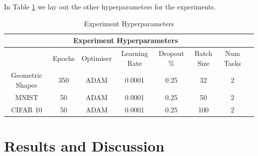 In Table \ref{tab:HyperParams2} we lay out the other hyperparameters for the experiments.

\begin{table}[h!]
\caption{Experiment Hyperparameters} \label{tab:HyperParams2}
\hspace*{-2cm}
\begin{tabular}{|c||c|c|c|c|c|c|c|}
\hline
\multicolumn{7}{|c|}{Experiment Hyperparameters} \\
\hline
 &Epochs & Optimiser &Learning Rate & Dropout \% & Batch Size & Num Tasks\\
\hline
Geometric Shapes & 350 & ADAM & 0.0001 & 0.25 & 32 & 2  \\
\hline
MNIST & 50 & ADAM & 0.0001 & 0.25 & 50 & 2  \\
\hline
CIFAR 10 & 50 & ADAM & 0.0001 & 0.25 & 100 & 2  \\
\hline
\end{tabular}
\end{table}


\section{Results and Discussion}


